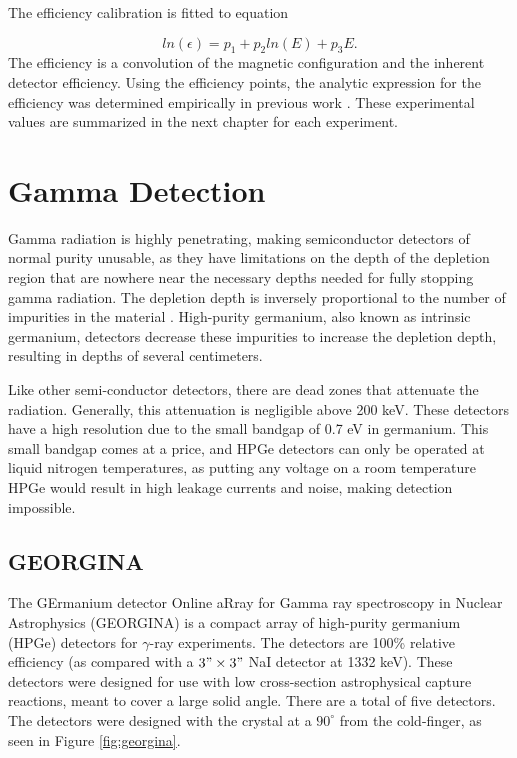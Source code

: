 

The efficiency calibration is fitted to equation

\begin{equation}
    ln(\epsilon) = p_1+p_2ln(E)+p_3E.
    \label{eq:SiLi_Eff}
\end{equation}
The efficiency is a convolution of the magnetic configuration and the inherent detector efficiency. Using the efficiency points, the analytic expression for the efficiency was determined empirically in previous work \citep{battaglia15:_iceball_176lu}. These experimental values are summarized in the next chapter for each experiment.

\section{Gamma Detection}

Gamma radiation is highly penetrating, making semiconductor detectors of normal purity unusable, as they have limitations on the depth of the depletion region that are nowhere near the necessary depths needed for fully stopping gamma radiation. The depletion depth is inversely proportional to the number of impurities in the material \citep{knoll00:rad_det_meas}. High-purity germanium, also known as intrinsic germanium, detectors decrease these impurities to increase the depletion depth, resulting in depths of several centimeters.

Like other semi-conductor detectors, there are dead zones that attenuate the radiation. Generally, this attenuation is negligible above 200 keV. These detectors have a high resolution due to the small bandgap of 0.7 eV in germanium. This small bandgap comes at a price, and HPGe detectors can only be operated at liquid nitrogen temperatures, as putting any voltage on a room temperature HPGe would result in high leakage currents and noise, making detection impossible.

\subsection{GEORGINA}

The GErmanium detector Online aRray for Gamma ray spectroscopy in Nuclear Astrophysics (GEORGINA) is a compact array of high-purity germanium (HPGe) detectors for $\gamma$-ray experiments\citep{isnap18:_georgina}. The detectors are 100\% relative efficiency (as compared with a $3"\times3"$ NaI detector at 1332 keV). These detectors were designed for use with low cross-section astrophysical capture reactions, meant to cover a large solid angle. There are a total of five detectors. The detectors were designed with the crystal at a $90^{\circ}$ from the cold-finger, as seen in Figure \ref{fig:georgina}.

